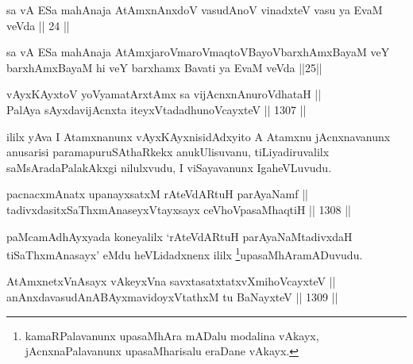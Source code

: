 
\begin{kandikeshl}
sa vA ESa mahAnaja AtAmxnAnxdoV vasudAnoV vinadxteV vasu ya EvaM veVda || 24 ||
\end{kandikeshl}

\begin{kandikeshl}
sa vA ESa mahAnaja AtAmxjaroV\s maroV\s maqtoV\s BayoV\break barxhAmxBayaM veY barxhAmxBayaM hi veY barxhamx Bavati ya EvaM veVda ||25||
\end{kandikeshl}

\begin{shl}
vAyxKAyxtoV yoV\s yamatArx\s \s tAmx sa vijAcnxnAnuroVdhataH || \\
PalAya sAyxdavijAcnxta iteyxVtadadhunoVcayxteV \hfill || 1307 ||  
\end{shl}

\begin{artha}
ililx yAva I Atamxnanunx vAyxKAyxnisidAdxyito A Atamxnu jAcnxnavanunx anusarisi paramapuruSAthaRkekx anukUlisuvanu, tiLiyadiruvalilx saMsAradaPalakAkxgi nilulxvudu, I viSayavanunx Iga\break heVLuvudu.
\end{artha}


\begin{shl}
pacnacxmAnatx upanayxsatxM rAteVdARtuH parAyaNamf || \\
tadivxdasitxSaThxmAnaseyxVtayxsayx ceVhoVpasaMhaqtiH \hfill || 1308 ||  
\end{shl}

\begin{artha}
paMcamAdhAyxyada koneyalilx `rAteVdARtuH parAyaNaM\break tadivxdaH tiSaThxmAnasayx' eMdu heVLidadxnenx ililx \footnote{kamaRPalavanunx upasaMhAra mADalu modalina vAkayx, jAcnxnaPalavanunx upasaMharisalu eraDane vAkayx.}upasaMhAra\break mADuvudu.
\end{artha}


\begin{shl}
AtAmxnetxVnAsayx vAkeyxVna savxtasatxtatxvXmihoVcayxteV || \\
anAnxdavasudAnABAyxmavidoyxVtathxM tu BaNayxteV \hfill || 1309 ||  
\end{shl}

